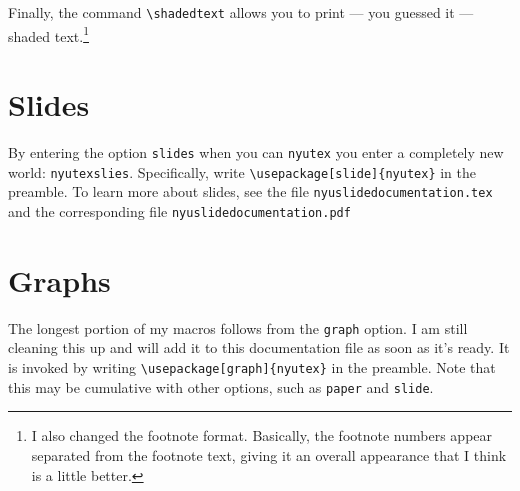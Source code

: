 \documentclass{article}
\begin{document}
Finally, the command \verb|\shadedtext| allows you to print --- you guessed it --- shaded text.\footnote{I also changed the footnote format. Basically, the footnote numbers appear separated from the footnote text, giving it an overall appearance that I think is a little better.}

\begin{center}
\end{center}

\section{Slides}

By entering the option \verb|slides| when you can \verb|nyutex| you enter a completely new world: \verb|nyutexslies|. Specifically, write \verb|\usepackage[slide]{nyutex}| in the preamble. To learn more about slides, see the file \verb|nyuslidedocumentation.tex| and the corresponding file \verb|nyuslidedocumentation.pdf|

\section{Graphs}

The longest portion of my macros follows from the \verb|graph| option. I am still cleaning this up and will add it to this documentation file as soon as it's ready. It is invoked by writing \verb|\usepackage[graph]{nyutex}| in the preamble. Note that this may be cumulative with other options, such as \verb|paper| and \verb|slide|.
\end{document}
